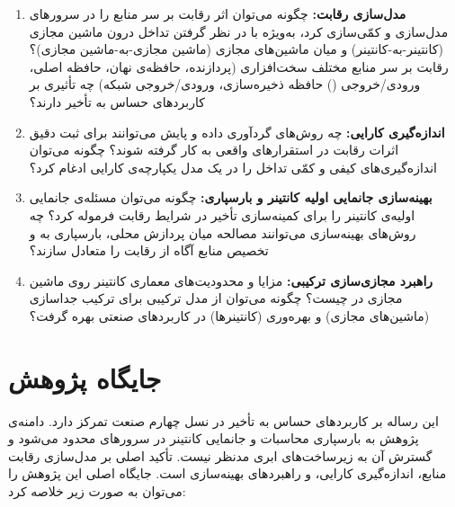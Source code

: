 \begin{enumerate}
\item
\textbf{مدل‌سازی رقابت:}
چگونه می‌توان اثر رقابت بر سر منابع را در سرورهای  مدل‌سازی و کمّی‌سازی کرد، به‌ویژه با در نظر گرفتن تداخل درون ماشین مجازی (کانتینر-به-کانتینر) و میان ماشین‌های مجازی (ماشین مجازی-به-ماشین مجازی)؟
رقابت بر سر منابع مختلف سخت‌افزاری (پردازنده، حافظه‌ی نهان، حافظه اصلی، ورودی/خروجی () حافظه ذخیره‌سازی، ورودی/خروجی شبکه) چه تأثیری بر کاربردهای حساس به تأخیر دارند؟

\item
\textbf{اندازه‌گیری کارایی:}
چه روش‌های گردآوری داده و پایش می‌توانند برای ثبت دقیق اثرات رقابت در استقرارهای واقعی  به کار گرفته شوند؟
چگونه می‌توان اندازه‌گیری‌های کیفی و کمّی تداخل را در یک مدل یکپارچه‌ی کارایی ادغام کرد؟

\item
\textbf{بهینه‌سازی جانمایی اولیه کانتینر و بارسپاری:}
چگونه می‌توان مسئله‌ی جانمایی اولیه‌ی کانتینر را برای کمینه‌سازی تأخیر در شرایط رقابت فرموله کرد؟
چه روش‌های بهینه‌سازی می‌توانند مصالحه میان پردازش محلی، بارسپاری به  و تخصیص منابع آگاه از رقابت را متعادل سازند؟

\item
\textbf{راهبرد مجازی‌سازی ترکیبی:}
مزایا و محدودیت‌های معماری کانتینر روی ماشین مجازی در  چیست؟
چگونه می‌توان از مدل ترکیبی برای ترکیب جداسازی (ماشین‌های مجازی) و بهره‌وری (کانتینرها) در کاربردهای صنعتی بهره گرفت؟

\end{enumerate}

\section{جایگاه پژوهش}

این رساله بر کاربردهای حساس به تأخیر در نسل چهارم صنعت تمرکز دارد. دامنه‌ی پژوهش به بارسپاری محاسبات و جانمایی کانتینر در سرورهای  محدود می‌شود و گسترش آن به زیرساخت‌های ابری مدنظر نیست. تأکید اصلی بر مدل‌سازی رقابت منابع، اندازه‌گیری کارایی، و راهبردهای بهینه‌سازی است.
جایگاه اصلی این پژوهش را می‌توان به صورت زیر خلاصه کرد:

